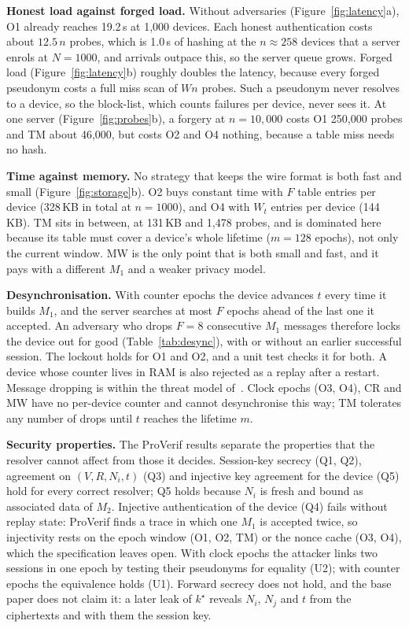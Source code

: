 \textbf{Honest load against forged load.} Without adversaries (Figure~\ref{fig:latency}a), O1 already reaches 19.2\,s at 1,000 devices. Each honest authentication costs about $12.5\,n$ probes, which is 1.0\,s of hashing at the $n\approx258$ devices that a server enrols at $N=1000$, and arrivals outpace this, so the server queue grows. Forged load (Figure~\ref{fig:latency}b) roughly doubles the latency, because every forged pseudonym costs a full miss scan of $Wn$ probes. Such a pseudonym never resolves to a device, so the block-list, which counts failures per device, never sees it. At one server (Figure~\ref{fig:probes}b), a forgery at $n=10{,}000$ costs O1 250,000 probes and TM about 46,000, but costs O2 and O4 nothing, because a table miss needs no hash.

\textbf{Time against memory.} No strategy that keeps the wire format is both fast and small (Figure~\ref{fig:storage}b). O2 buys constant time with $F$ table entries per device (328\,KB in total at $n=1000$), and O4 with $W_t$ entries per device (144\,KB). TM sits in between, at 131\,KB and 1,478 probes, and is dominated here because its table must cover a device's whole lifetime ($m=128$ epochs), not only the current window. MW is the only point that is both small and fast, and it pays with a different $M_1$ and a weaker privacy model.

\textbf{Desynchronisation.} With counter epochs the device advances $t$ every time it builds $M_1$, and the server searches at most $F$ epochs ahead of the last one it accepted. An adversary who drops $F=8$ consecutive $M_1$ messages therefore locks the device out for good (Table~\ref{tab:desync}), with or without an earlier successful session. The lockout holds for O1 and O2, and a unit test checks it for both. A device whose counter lives in RAM is also rejected as a replay after a restart. Message dropping is within the threat model of~\cite{base}. Clock epochs (O3, O4), CR and MW have no per-device counter and cannot desynchronise this way; TM tolerates any number of drops until $t$ reaches the lifetime $m$.

\textbf{Security properties.} The ProVerif results separate the properties that the resolver cannot affect from those it decides. Session-key secrecy (Q1, Q2), agreement on $(V,R,N_i,t)$ (Q3) and injective key agreement for the device (Q5) hold for every correct resolver; Q5 holds because $N_i$ is fresh and bound as associated data of $M_2$. Injective authentication of the device (Q4) fails without replay state: ProVerif finds a trace in which one $M_1$ is accepted twice, so injectivity rests on the epoch window (O1, O2, TM) or the nonce cache (O3, O4), which the specification leaves open. With clock epochs the attacker links two sessions in one epoch by testing their pseudonyms for equality (U2); with counter epochs the equivalence holds (U1). Forward secrecy does not hold, and the base paper does not claim it: a later leak of $k^\star$ reveals $N_i$, $N_j$ and $t$ from the ciphertexts and with them the session key.

